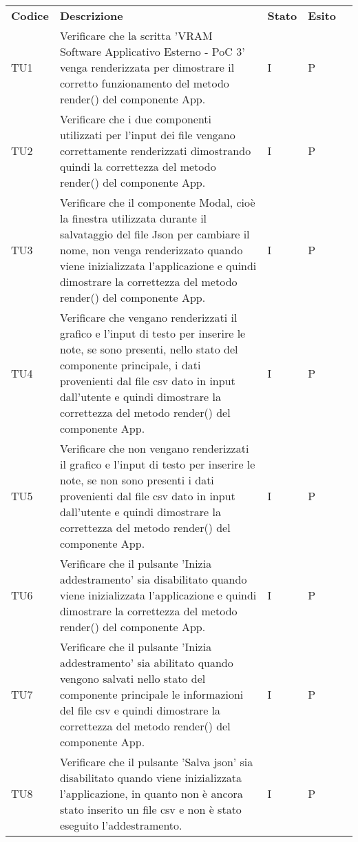 \begin{longtable} {
		>{}p{15mm} 
		>{}p{79.5mm}
		>{}p{15mm} 
		>{}p{15mm}
		>{}p{0mm}}
	\rowcolor{gray!50}
	\textbf{Codice} & \textbf{Descrizione} & \textbf{Stato} & \textbf{Esito} &\TBstrut \\
	TU1		& Verificare che la scritta 'VRAM Software Applicativo Esterno - PoC 3' venga renderizzata per dimostrare il corretto funzionamento del metodo render() del componente App. & I & P &\TBstrut \\ [2mm]
	TU2		& Verificare che i due componenti utilizzati per l'input dei file vengano correttamente renderizzati dimostrando quindi la correttezza del metodo render() del componente App. & I & P &\TBstrut \\ [2mm]
	TU3		& Verificare che il componente Modal, cioè la finestra utilizzata durante il salvataggio del file Json per cambiare il nome, non venga renderizzato quando viene inizializzata l'applicazione e quindi dimostrare la correttezza del metodo render() del componente App. & I & P &\TBstrut \\ [2mm]
	TU4		& Verificare che vengano renderizzati il grafico e l'input di testo per inserire le note, se sono presenti, nello stato del componente principale, i dati provenienti dal file csv dato in input dall'utente e quindi dimostrare la correttezza del metodo render() del componente App. & I & P &\TBstrut \\ [2mm]
	TU5		& Verificare che non vengano renderizzati il grafico e l'input di testo per inserire le note, se non sono presenti i dati provenienti dal file csv dato in input dall'utente e quindi dimostrare la correttezza del metodo render() del componente App. & I & P &\TBstrut \\ [2mm]
	TU6		& Verificare che il pulsante 'Inizia addestramento' sia disabilitato quando viene inizializzata l'applicazione e quindi dimostrare la correttezza del metodo render() del componente App. & I & P &\TBstrut \\ [2mm]
	TU7		& Verificare che il pulsante 'Inizia addestramento' sia abilitato quando vengono salvati nello stato del componente principale le informazioni del file csv e quindi dimostrare la correttezza del metodo render() del componente App. & I & P &\TBstrut \\ [2mm]
	TU8		& Verificare che il pulsante 'Salva json' sia disabilitato quando viene inizializzata l'applicazione, in quanto non è ancora stato inserito un file csv e non è stato eseguito l'addestramento. & I & P &\TBstrut \\ [2mm]

\end{longtable}
